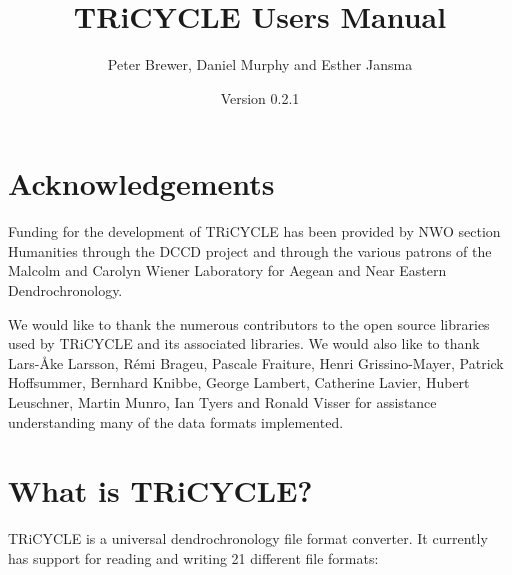 \documentclass[10pt, headsepline,DIV14,BCOR0.5cm]{scrreprt}
\title{TRiCYCLE Users Manual}
\author{Peter Brewer, Daniel Murphy and Esther Jansma}
\date{Version 0.2.1}
\begin{document}
\maketitle


\tableofcontents

\chapter{Acknowledgements}

Funding for the development of TRiCYCLE has been provided by NWO section Humanities through the
DCCD project and through the various patrons of the Malcolm and Carolyn Wiener Laboratory for Aegean
and Near Eastern Dendrochronology.

We would like to thank the numerous contributors to the open source libraries used by TRiCYCLE and
its associated libraries. We would also like to thank Lars-Åke Larsson, Rémi Brageu, Pascale Fraiture,
Henri Grissino-Mayer, Patrick Hoffsummer, Bernhard Knibbe, George Lambert, Catherine Lavier, Hubert
Leuschner, Martin Munro, Ian Tyers and Ronald Visser for assistance understanding many of the data
formats implemented.

\chapter{What is TRiCYCLE?}

TRiCYCLE is a universal dendrochronology file format converter. It currently has support for reading and
writing 21 different file formats:
\end{document}
